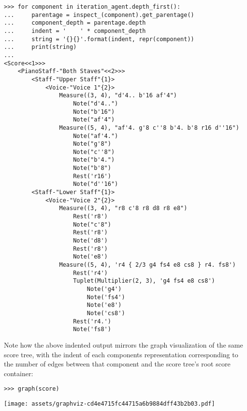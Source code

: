 \begin{abjadbookoutput}
\begin{singlespacing}
\vspace{-0.5\baselineskip}
\begin{verbatim}
>>> for component in iteration_agent.depth_first():
...     parentage = inspect_(component).get_parentage()
...     component_depth = parentage.depth
...     indent = '    ' * component_depth
...     string = '{}{}'.format(indent, repr(component))
...     print(string)
...
<Score<<1>>>
    <PianoStaff-"Both Staves"<<2>>>
        <Staff-"Upper Staff"{1}>
            <Voice-"Voice 1"{2}>
                Measure((3, 4), "d'4.. b'16 af'4")
                    Note("d'4..")
                    Note("b'16")
                    Note("af'4")
                Measure((5, 4), "af'4. g'8 c''8 b'4. b'8 r16 d''16")
                    Note("af'4.")
                    Note("g'8")
                    Note("c''8")
                    Note("b'4.")
                    Note("b'8")
                    Rest('r16')
                    Note("d''16")
        <Staff-"Lower Staff"{1}>
            <Voice-"Voice 2"{2}>
                Measure((3, 4), "r8 c'8 r8 d8 r8 e8")
                    Rest('r8')
                    Note("c'8")
                    Rest('r8')
                    Note('d8')
                    Rest('r8')
                    Note('e8')
                Measure((5, 4), 'r4 { 2/3 g4 fs4 e8 cs8 } r4. fs8')
                    Rest('r4')
                    Tuplet(Multiplier(2, 3), 'g4 fs4 e8 cs8')
                        Note('g4')
                        Note('fs4')
                        Note('e8')
                        Note('cs8')
                    Rest('r4.')
                    Note('fs8')
\end{verbatim}
\end{singlespacing}
\end{abjadbookoutput}

\noindent Note how the above indented output mirrors the graph visualization of
the same score tree, with the indent of each components representation
corresponding to the number of edges between that component and the score
tree's root score container:

\begin{comment}
<abjad>
graph(score)
</abjad>
\end{comment}

\begin{abjadbookoutput}
\begin{singlespacing}
\vspace{-0.5\baselineskip}
\begin{verbatim}
>>> graph(score)
\end{verbatim}
\noindent\texttt{[image: assets/graphviz-cd4e4715fc44715a6b9884dff43b2b03.pdf]}
\end{singlespacing}
\end{abjadbookoutput}

